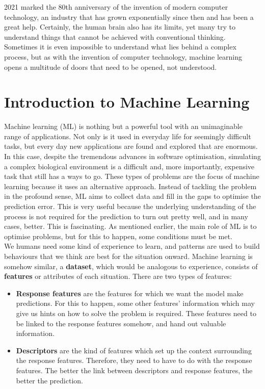
\hspace{1.5cm}2021 marked the 80th anniversary of the invention of modern computer technology, an industry that has grown exponentially since then and has been a great help. Certainly, the human brain also has its limits, yet many try to understand things that cannot be achieved with conventional thinking. Sometimes it is even impossible to understand what lies behind a complex process, but as with the invention of computer technology, machine learning opens a multitude of doors that need to be opened, not understood.\\ 


\section{Introduction to Machine Learning}
Machine learning (ML) is nothing but a powerful tool with an unimaginable range of applications. Not only is it used in everyday life for seemingly difficult tasks, but every day new applications are found and explored that are enormous. In this case, despite the tremendous advances in software optimisation, simulating a complex biological environment is a difficult and, more importantly, expensive task that still has a ways to go. These types of problems are the focus of machine learning because it uses an alternative approach. Instead of tackling  the problem in the profound sense, ML aims to collect data and fill in the gaps to optimise the prediction error. This is very useful because the underlying understanding of the process is not required for the prediction to turn out pretty well, and in many cases, better. This is fascinating. As mentioned earlier, the main role of ML is to optimise problems, but for this to happen, some conditions must be met.\\

We humans need some kind of experience to learn, and patterns are used to build behaviours that we think are best for the situation onward.
Machine learning is somehow similar, a \textbf{dataset}, which would be analogous to experience, consists of \textbf{features} or attributes of each situation. There are two types of features:
\begin{itemize}
    \item \textbf{Response features}  are the features for which we want the model make predictions. For this to happen, some other features' information which may give us hints on how to solve the problem is required. These features need to be linked to the response features somehow, and hand out valuable information.
    
    
    \item \textbf{Descriptors} are the kind of features which set up the context surrounding the response features. Therefore, they need to have to do with the response features. The better the link between descriptors and response features, the better the prediction.

\end{itemize}
\vspace{0.6cm}

